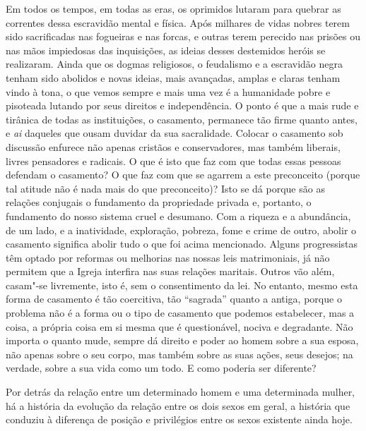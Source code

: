 Em todos os tempos, em todas as eras, os oprimidos lutaram para quebrar
as correntes dessa escravidão mental e física. Após milhares de vidas
nobres terem sido sacrificadas nas fogueiras e nas forcas, e outras
terem perecido nas prisões ou nas mãos impiedosas das inquisições, as
ideias desses destemidos heróis se realizaram. Ainda que os
dogmas religiosos, o feudalismo e a escravidão negra tenham sido abolidos e
novas ideias, mais avançadas, amplas e claras tenham vindo à tona, o que vemos
sempre e mais uma vez é a humanidade pobre e pisoteada lutando por seus
direitos e independência. O ponto é que a mais rude e tirânica de todas
as instituições, o casamento, permanece tão firme quanto antes, e \textit{ai}
daqueles que ousam duvidar da sua sacralidade. Colocar o casamento sob
discussão enfurece não apenas cristãos e conservadores, mas também
liberais, livres pensadores e radicais. O que é isto que faz com que
todas essas pessoas defendam o casamento? O que faz com que se agarrem a
este preconceito (porque tal atitude não é nada mais do que
preconceito)? Isto se dá porque são as relações conjugais o fundamento
da propriedade privada e, portanto, o fundamento do nosso sistema cruel\label{cruel}
e desumano. Com a riqueza e a abundância, de um lado, e a inatividade,
exploração, pobreza, fome e crime de outro, abolir o casamento significa
abolir tudo o que foi acima mencionado. Alguns progressistas têm optado
por reformas ou melhorias nas nossas leis matrimoniais, já não permitem
que a Igreja interfira nas suas relações maritais. Outros vão além,
casam"-se livremente, isto é, sem o consentimento da lei. No entanto,
mesmo esta forma de casamento é tão coercitiva, tão ``sagrada'' quanto
a antiga, porque o problema não é a forma ou o tipo de casamento que
podemos estabelecer, mas a coisa, a própria coisa em si mesma que é
questionável, nociva e degradante. Não importa o quanto mude, sempre dá
direito e poder ao homem sobre a sua esposa, não apenas sobre o seu corpo,
mas também sobre as suas ações, seus desejos; na verdade, sobre a sua vida
como um todo. E como poderia ser diferente?

Por detrás da relação entre um determinado homem e uma determinada
mulher, há a história da evolução da relação entre os dois sexos em
geral, a história que conduziu à diferença de posição e privilégios
entre os sexos existente ainda hoje.

